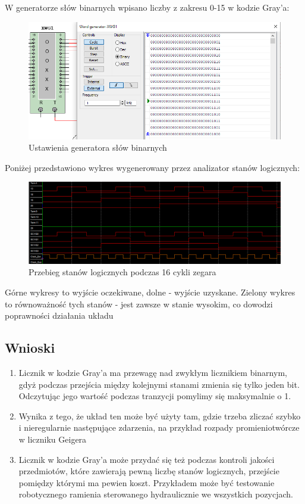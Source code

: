 \documentclass[12pt,a4paper,table]{article}
\begin{document}
    \pagebreak
    W generatorze słów binarnych wpisano liczby z zakresu 0-15 w kodzie Gray'a:
    \begin{figure}[h!]
        \centering
        \includegraphics[width=0.8\linewidth]{images/gray_xwb.PNG}
        \caption{Ustawienia generatora słów binarnych}
        \label{fig:gray_xwb}
    \end{figure}

    Poniżej przedstawiono wykres wygenerowany przez analizator stanów logicznych:
    \begin{figure}[h]
        \centering
        \includegraphics[width=0.9\linewidth]{images/gray_xla.PNG}
        \caption{Przebieg stanów logicznych podczas 16 cykli zegara}
        \label{fig:gray_xla}
    \end{figure}

    Górne wykresy to wyjście oczekiwane, dolne - wyjście uzyskane. Zielony wykres to równoważność
    tych stanów - jest zawsze w stanie wysokim, co dowodzi poprawności działania układu

    \subsection{Wnioski}
    \begin{enumerate}
        \item Licznik w kodzie Gray'a ma przewagę nad zwykłym licznikiem binarnym, gdyż podczas przejścia
        między kolejnymi stanami zmienia się tylko jeden bit. Odczytując jego wartość podczas tranzycji
        pomylimy się maksymalnie o 1.
        \item Wynika z tego, że układ ten może być użyty tam, gdzie trzeba zliczać szybko i nieregularnie
        następujące zdarzenia, na przykład rozpady promieniotwórcze w liczniku Geigera
        \item Licznik w kodzie Gray'a może przydać się też podczas kontroli jakości przedmiotów, które
        zawierają pewną liczbę stanów logicznych, przejście pomiędzy którymi ma pewien koszt. Przykładem może być
        testowanie robotycznego ramienia sterowanego hydraulicznie we wszystkich pozycjach.
    \end{enumerate}
\end{document}
